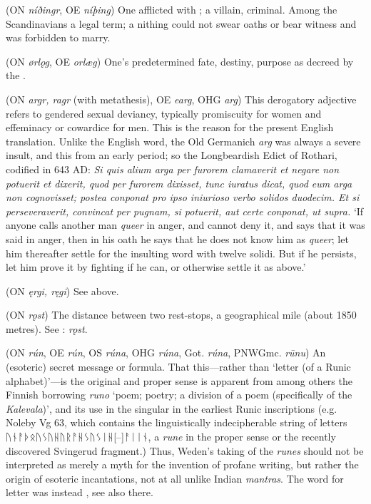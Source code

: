 \begin{itemize}
 (ON \emph{níðingr}, OE \emph{níþing})
  One afflicted with ; a villain, criminal.  Among the Scandinavians a legal term; a nithing could not swear oaths or bear witness and was forbidden to marry.

 (ON \emph{ørlǫg}, OE \emph{orlæg})
  One’s predetermined fate, destiny, purpose as decreed by the .

 (ON \emph{argr, ragr} (with metathesis), OE \emph{earg}, OHG \emph{arg})
  This derogatory adjective refers to gendered sexual deviancy, typically promiscuity for women and effeminacy or cowardice for men.  This is the reason for the present English translation.  Unlike the English word, the Old Germanich \emph{arg} was always a severe insult, and this from an early period; so the Longbeardish Edict of Rothari, codified in 643 AD: \emph{Si quis alium \emph{arga} per furorem clamaverit et negare non potuerit et dixerit, quod per furorem dixisset, tunc iuratus dicat, quod eum \emph{arga} non cognovisset; postea conponat pro ipso iniurioso verbo solidos duodecim. Et si perseveraverit, convincat per pugnam, si potuerit, aut certe conponat, ut supra.} ‘If anyone calls another man \emph{queer} in anger, and cannot deny it, and says that it was said in anger, then in his oath he says that he does not know him as \emph{queer}; let him thereafter settle for the insulting word with twelve solidi.  But if he persists, let him prove it by fighting if he can, or otherwise settle it as above.’

 (ON \emph{ęrgi, ręgi})
  See  above.

 (ON \emph{rǫst})
  The distance between two rest-stops, a geographical mile (about 1850 metres).  See \CV: \emph{rǫst}.

 (ON \emph{rún}, OE \emph{rún}, OS \emph{rúna}, OHG \emph{rúna}, Got. \emph{rúna}, PNWGmc. \emph{rūnu})
  An (esoteric) secret message or formula. That this—rather than ‘letter (of a Runic alphabet)’—is the original and proper sense is apparent from among others the Finnish borrowing \emph{runo} ‘poem; poetry; a division of a poem (specifically of the \emph{Kalevala})’, and its use in the singular in the earliest Runic inscriptions (e.g. Noleby Vg 63, which contains the linguistically indecipherable string of letters {ᚢᚾᚨᚦᛟᚢᛊᚢᚺᚢᚱᚨᚺᛊᚢᛊᛁᚺ[--]ᚨᛁᛁᚾ}, a \emph{rune} in the proper sense or the recently discovered Svingerud fragment.) Thus, Weden’s taking of the \emph{runes} should not be interpreted as merely a myth for the invention of profane writing, but rather the origin of esoteric incantations, not at all unlike Indian \emph{mantras}.
  The word for letter was instead , see also there.


\end{itemize}
